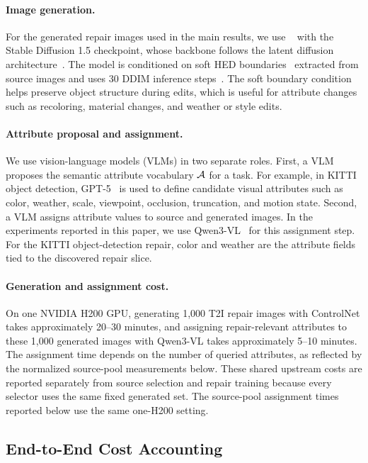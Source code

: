 \paragraph{Image generation.}
For the generated repair images used in the main results, we use \controlnet~\citep{zhang2023adding} with the Stable Diffusion 1.5 checkpoint, whose backbone follows the latent diffusion architecture~\citep{rombach2022high}. The model is conditioned on soft HED boundaries~\citep{xie2015holistically} extracted from source images and uses 30 DDIM inference steps~\citep{ddim}. The soft boundary condition helps preserve object structure during edits, which is useful for attribute changes such as recoloring, material changes, and weather or style edits.

\paragraph{Attribute proposal and assignment.}
We use vision-language models (VLMs) in two separate roles. First, a VLM proposes the semantic attribute vocabulary $\mathcal{A}$ for a task. For example, in KITTI object detection, GPT-5~\citep{openai2025gpt5} is used to define candidate visual attributes such as color, weather, scale, viewpoint, occlusion, truncation, and motion state. Second, a VLM assigns attribute values to source and generated images. In the experiments reported in this paper, we use Qwen3-VL~\citep{bai2025qwen3vl} for this assignment step. For the KITTI object-detection repair, color and weather are the attribute fields tied to the discovered repair slice.

\paragraph{Generation and assignment cost.}
On one NVIDIA H200 GPU, generating 1,000 T2I repair images with ControlNet takes approximately 20--30 minutes, and assigning repair-relevant attributes to these 1,000 generated images with Qwen3-VL takes approximately 5--10 minutes. The assignment time depends on the number of queried attributes, as reflected by the normalized source-pool measurements below. These shared upstream costs are reported separately from source selection and repair training because every selector uses the same fixed generated set. The source-pool assignment times reported below use the same one-H200 setting.

\subsection{End-to-End Cost Accounting}
\label{app:end-to-end-cost}

